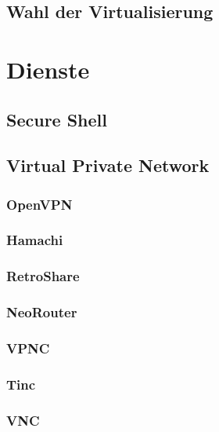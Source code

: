 \subsection{Wahl der Virtualisierung}

\section{Dienste}
\subsection{Secure Shell}

\subsection{Virtual Private Network}
\subsubsection{OpenVPN}

\subsubsection{Hamachi}

\subsubsection{RetroShare}

\subsubsection{NeoRouter}

\subsubsection{VPNC}

\subsubsection{Tinc}

\subsubsection{VNC}

